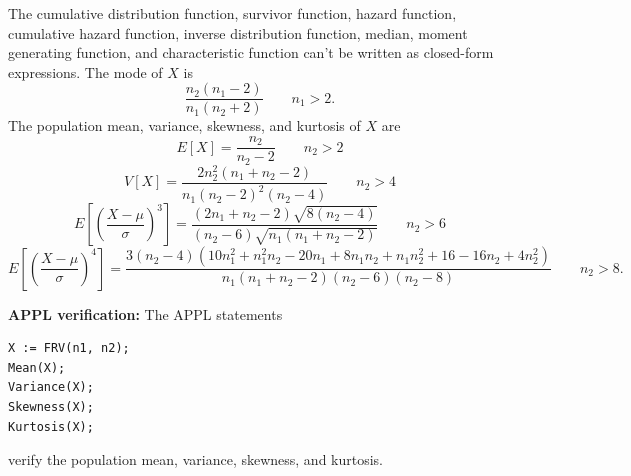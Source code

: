 \documentclass[12pt,fullpage]{article}
\begin{document}
%
%
The cumulative distribution function, survivor function, hazard function, cumulative hazard
function, inverse distribution function, median, moment generating function, and
characteristic function can't be written as closed-form expressions.
The mode of $X$ is
$$
\frac{n_2(n_{1}-2)}{n_{1}(n_2 + 2)} \qquad n_{1} > 2.
$$
The population mean, variance, skewness, and kurtosis of $X$ are
$$
E[X] = \frac{n_{2}}{n_{2}-2} \qquad n_{2}>2
$$
$$
V[X] = \frac{2n_{2}^{2}(n_{1}+n_{2}-2)}{n_{1}(n_{2}-2)^{2}(n_{2}-4)} \qquad n_{2}>4
$$
$$
E\left[ \left( \frac{X - \mu}{\sigma} \right) ^ 3 \right] =
\frac{(2n_{1}+n_{2}-2)\sqrt{8(n_{2}-4)}}{(n_{2}-6)\sqrt{n_{1}(n_{1}+n_{2}-2)}} \qquad n_2 > 6
$$
$$
E\left[ \left( \frac{X - \mu}{\sigma} \right) ^ 4 \right] =
\frac{3 \left(n_2 - 4 \right)  \left( 10n_1^2 + n_1^2 n_2 - 20{n_1} + 8 n_1 n_2 +
n_1 n_2^2 + 16 - 16 n_2 + 4 n_2^2 \right)}
{n_1 \left( n_1 + n_2 -2 \right)  \left(  n_2 - 6 \right)  \left(  n_2 - 8 \right)} \qquad n_2 > 8.
$$
%
%

\vspace{0.1in}

\noindent
{\bf APPL verification:}
The APPL statements
\begin{verbatim}
X := FRV(n1, n2);
Mean(X);
Variance(X);
Skewness(X);
Kurtosis(X);
\end{verbatim}
verify the population mean, variance, skewness, and kurtosis.
\end{document}
